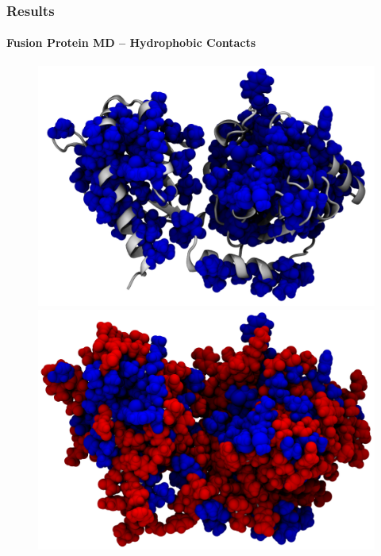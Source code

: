 \documentclass[english]{beamer}
\begin{document}
\begin{frame}
    \frametitle{Results}
    \framesubtitle{Fusion Protein MD -- Hydrophobic Contacts}  

    \vspace{0.06\topmargin}

    \begin{figure}
        \begin{minipage}[]{0.45\linewidth}
            \centering
            \includegraphics[width=\textwidth]{figures/Complex_hydrophobic_core/hydrophobic_core_linker.png}
        \end{minipage}
    \hspace{0.5cm}
        \begin{minipage}[]{0.45\linewidth}
            \centering
            \includegraphics[width=\textwidth]{figures/Complex_hydrophobic_core/protein.png}
        \end{minipage}
    \end{figure}     
 
    
\end{frame}       
 
\end{document}
